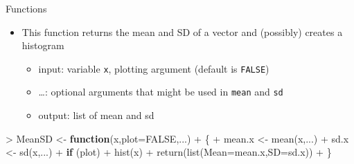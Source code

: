 \documentclass[
  ignorenonframetext,
]{beamer}
\newenvironment{Shaded}{\begin{snugshade}}{\end{snugshade}}
\newcommand{\AttributeTok}[1]{\textcolor[rgb]{0.77,0.63,0.00}{#1}}
\newcommand{\ConstantTok}[1]{\textcolor[rgb]{0.00,0.00,0.00}{#1}}
\newcommand{\ControlFlowTok}[1]{\textcolor[rgb]{0.13,0.29,0.53}{\textbf{#1}}}
\newcommand{\FunctionTok}[1]{\textcolor[rgb]{0.00,0.00,0.00}{#1}}
\newcommand{\NormalTok}[1]{#1}
\newcommand{\OtherTok}[1]{\textcolor[rgb]{0.56,0.35,0.01}{#1}}
\newcommand{\SpecialCharTok}[1]{\textcolor[rgb]{0.00,0.00,0.00}{#1}}
\providecommand{\tightlist}{%
  \setlength{\itemsep}{0pt}\setlength{\parskip}{0pt}}
\begin{document}
\begin{frame}[fragile]{Functions}
\protect\hypertarget{functions-3}{}
\begin{itemize}[<+->]
\tightlist
\item
  This function returns the mean and SD of a vector and (possibly)
  creates a histogram

  \begin{itemize}[<+->]
  \tightlist
  \item
    input: variable \texttt{x}, plotting argument (default is
    \texttt{FALSE})
  \item
    \ldots: optional arguments that might be used in \texttt{mean} and
    \texttt{sd}
  \item
    output: list of mean and sd
  \end{itemize}
\end{itemize}

\begin{Shaded}
\begin{Highlighting}[]
\SpecialCharTok{\textgreater{}}\NormalTok{ MeanSD }\OtherTok{\textless{}{-}} \ControlFlowTok{function}\NormalTok{(x,}\AttributeTok{plot=}\ConstantTok{FALSE}\NormalTok{,...)}
\SpecialCharTok{+}\NormalTok{ \{}
\SpecialCharTok{+}\NormalTok{   mean.x }\OtherTok{\textless{}{-}} \FunctionTok{mean}\NormalTok{(x,...)}
\SpecialCharTok{+}\NormalTok{   sd.x }\OtherTok{\textless{}{-}} \FunctionTok{sd}\NormalTok{(x,...)}
\SpecialCharTok{+}   \ControlFlowTok{if}\NormalTok{ (plot) }
\SpecialCharTok{+}     \FunctionTok{hist}\NormalTok{(x)}
\SpecialCharTok{+}   \FunctionTok{return}\NormalTok{(}\FunctionTok{list}\NormalTok{(}\AttributeTok{Mean=}\NormalTok{mean.x,}\AttributeTok{SD=}\NormalTok{sd.x))}
\SpecialCharTok{+}\NormalTok{ \}}
\end{Highlighting}
\end{Shaded}
\end{frame}
\end{document}
